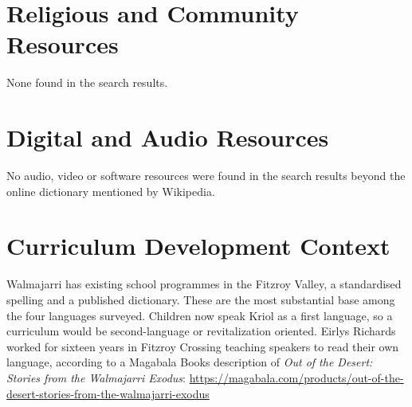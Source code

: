\documentclass[12pt]{article}
\begin{document}
\section{Religious and Community Resources}
None found in the search results.

\section{Digital and Audio Resources}
No audio, video or software resources were found in the search results beyond the online dictionary mentioned by Wikipedia.

\section{Curriculum Development Context}
Walmajarri has existing school programmes in the Fitzroy Valley, a standardised spelling and a published dictionary. These are the most substantial base among the four languages surveyed. Children now speak Kriol as a first language, so a curriculum would be second-language or revitalization oriented. Eirlys Richards worked for sixteen years in Fitzroy Crossing teaching speakers to read their own language, according to a Magabala Books description of \emph{Out of the Desert: Stories from the Walmajarri Exodus}: \url{https://magabala.com/products/out-of-the-desert-stories-from-the-walmajarri-exodus}
\end{document}
